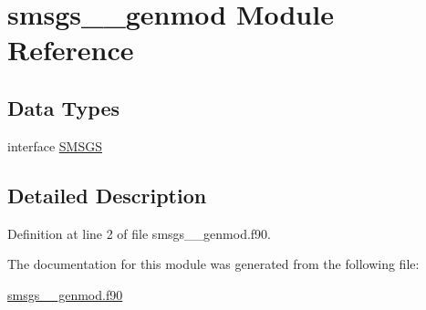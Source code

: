 \hypertarget{classsmsgs____genmod}{\section{smsgs\+\_\+\+\_\+genmod Module Reference}
\label{classsmsgs____genmod}
}
\subsection*{Data Types}
\begin{DoxyCompactItemize}
\item 
interface \hyperlink{interfacesmsgs____genmod_1_1SMSGS}{S\+M\+S\+G\+S}
\end{DoxyCompactItemize}


\subsection{Detailed Description}


Definition at line 2 of file smsgs\+\_\+\+\_\+genmod.\+f90.



The documentation for this module was generated from the following file\+:\begin{DoxyCompactItemize}
\item 
\hyperlink{smsgs____genmod_8f90}{smsgs\+\_\+\+\_\+genmod.\+f90}\end{DoxyCompactItemize}
